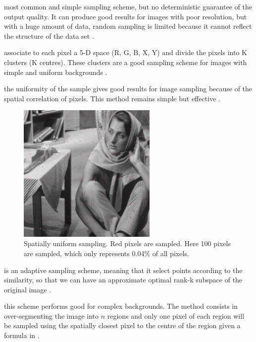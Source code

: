 \begin{description}[align=left]
 \item [Random sampling (RS)] most common and simple sampling scheme, but no deterministic guarantee of the output quality. It can produce good results for images with poor resolution, but with a huge amount of data, random sampling is limited because it cannot reflect the structure of the data set \cite{zhan_improved_2017}.
 \item [K-means sampling (KS)] associate to each pixel a 5-D space (R, G, B, X, Y) and divide the pixels into K clusters (K centres). These clusters are a good sampling scheme for images with simple and uniform backgrounds \cite{kao_sampling_2012} \cite{zhang_improved_2008}.
 \item [Uniform spatially sampling] the uniformity of the sample gives good results for image sampling because of the spatial correlation of pixels. This method remains simple but effective \cite{glide_2014}.
  \begin{figure}[H]
      \centering
      \includegraphics[width=0.6\textwidth]{img/spatiallyUniformSampling.png}
      \caption{Spatially uniform sampling. Red pixels are sampled. Here 100 pixels are sampled, which only represents 0.04\% of all pixels.}
  \end{figure}
 \item [Incremental sampling (INS)] is an adaptive sampling scheme, meaning that it select points according to the similarity, so that we can have an approximate optimal rank-k subspace of the original image \cite{zhan_improved_2017}.
 \item [Mean-shift segmentation-based sampling] this scheme performs good for complex backgrounds. The method consists in over-segmenting the image into \(n\) regions and only one pixel of each region will be sampled using the spatially closest pixel to the centre of the region given a formula in \cite{kao_sampling_2012}.
\end{description}

